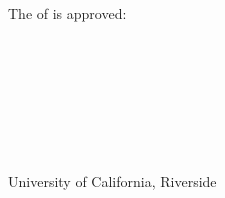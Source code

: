 

\vspace{1.0in}

The \DocumentType of \Author is approved: \\

\begin{center}
\vspace{0.5in}

\hspace{1.5in} \hrulefill \\
\vspace{1.0in}

\hspace{1.5in} \hrulefill \\
\vspace{1.0in}

\hspace{1.5in} \hrulefill \\

\end{center}

\\
\vfill
\begin{center}
    University of California, Riverside
\end{center}
